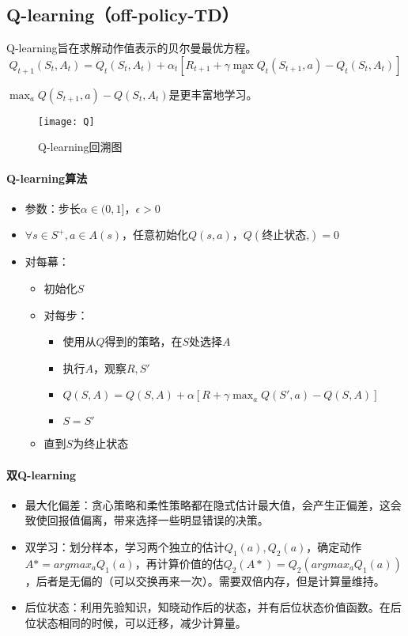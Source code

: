 \documentclass[
12pt, %
a4paper, 
oneside, %
headinclude,footinclude, %
]{scrartcl}
\begin{document}
\subsection{Q-learning（off-policy-TD）}
Q-learning旨在求解动作值表示的贝尔曼最优方程。
$$
Q_{t + 1}(S_t, A_t) = Q_t(S_t, A_t) + \alpha_t[R_{t + 1} + \gamma \max_a Q_t(S_{t + 1}, a) - Q_t(S_t, A_t)]
$$

$ \max_a Q(S_{t + 1}, a) - Q(S_t, A_t) $是更丰富地学习。

\begin{figure}[H]
\centering
\texttt{[image: Q]}
\caption[Q-learning回溯图]{Q-learning回溯图}
\end{figure}
\paragraph{Q-learning算法}
\begin{itemize}
\item 参数：步长$ \alpha \in (0,1] $，$ \epsilon > 0 $
\item $ \forall s \in S^+, a \in A(s) $，任意初始化$ Q(s,a) $，$ Q(\text{终止状态,}) = 0 $
\item 对每幕：
\begin{itemize}
\item 初始化$ S $
\item 对每步：
\begin{itemize}
\item 使用从$ Q $得到的策略，在$ S $处选择$ A $
\item 执行$ A $，观察$ R,S' $
\item $ Q(S, A) = Q(S, A) + \alpha [R + \gamma \max_a Q(S', a) - Q(S, A)] $
\item $ S = S' $
\end{itemize}
\item 直到$ S $为终止状态
\end{itemize}
\end{itemize}
\paragraph{双Q-learning}
\begin{itemize}
\item 最大化偏差：贪心策略和柔性策略都在隐式估计最大值，会产生正偏差，这会致使回报值偏离，带来选择一些明显错误的决策。
\item 双学习：划分样本，学习两个独立的估计$ Q_1(a),Q_2(a) $，确定动作$ A* = argmax_a Q_1(a) $，再计算价值的估$ Q_2(A*) = Q_2(argmax_a Q_1(a)) $，后者是无偏的（可以交换再来一次）。需要双倍内存，但是计算量维持。
\item 后位状态：利用先验知识，知晓动作后的状态，并有后位状态价值函数。在后位状态相同的时候，可以迁移，减少计算量。
\end{itemize}
\end{document}
